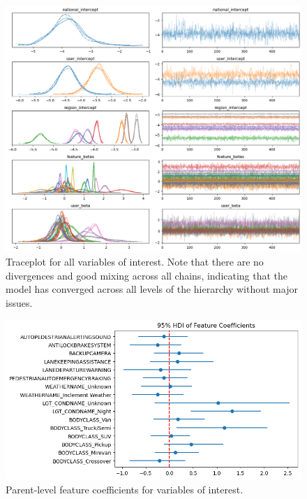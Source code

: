 \documentclass[12pt]{article}
\begin{document}
\begin{figure}
    \centering
    \includegraphics[width=\textwidth]{images/traceplot.png}
    \caption{Traceplot for all variables of interest. Note that there are no divergences and good mixing across all
        chains, indicating that the model has converged across all levels of the hierarchy without major issues.}
    \label{fig:traceplot}
\end{figure}



\begin{figure}
    \centering
    \includegraphics[width=\textwidth]{images/all_users_coefficients.png}
    \caption{Parent-level feature coefficients for variables of interest.}
    \label{fig:all_users}
\end{figure}
\end{document}
